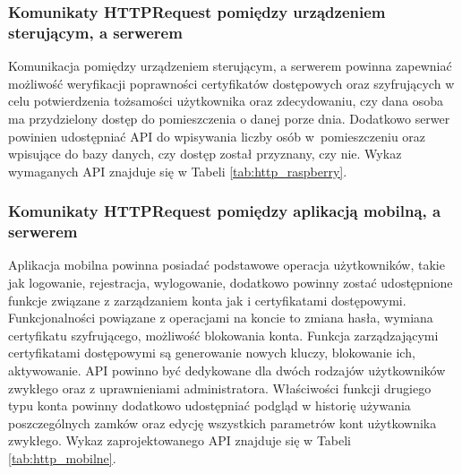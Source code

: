 	\subsubsection{Komunikaty HTTPRequest pomiędzy urządzeniem sterującym, a serwerem}
	Komunikacja pomiędzy urządzeniem sterującym, a serwerem powinna  zapewniać możliwość weryfikacji poprawności certyfikatów dostępowych oraz szyfrujących w celu potwierdzenia tożsamości użytkownika oraz zdecydowaniu, czy dana osoba ma przydzielony dostęp do pomieszczenia o danej porze dnia. Dodatkowo serwer powinien udostępniać API do wpisywania liczby osób w~pomieszczeniu oraz wpisujące do bazy danych, czy dostęp został przyznany, czy nie. Wykaz wymaganych API znajduje się w Tabeli \ref{tab:http_raspberry}.
	\subsubsection{Komunikaty HTTPRequest pomiędzy aplikacją mobilną, a serwerem}
	Aplikacja mobilna powinna posiadać podstawowe operacja użytkowników, takie jak logowanie, rejestracja, wylogowanie, dodatkowo powinny zostać udostępnione funkcje związane z zarządzaniem konta jak i certyfikatami dostępowymi. Funkcjonalności powiązane z operacjami na koncie to zmiana hasła, wymiana certyfikatu szyfrującego, możliwość blokowania konta. Funkcja zarządzającymi certyfikatami dostępowymi są generowanie nowych kluczy, blokowanie ich, aktywowanie. API powinno być dedykowane dla dwóch rodzajów użytkowników zwykłego oraz z uprawnieniami administratora. Właściwości funkcji drugiego typu konta powinny dodatkowo udostępniać podgląd w historię używania poszczególnych zamków oraz edycję wszystkich parametrów kont użytkownika zwykłego. Wykaz zaprojektowanego API znajduje się w Tabeli \ref{tab:http_mobilne}.\cite{programowanie_aplikacji_webowych}
